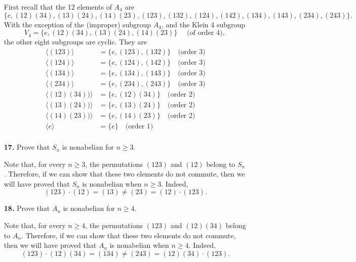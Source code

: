 \documentclass[12pt,reqno]{amsart}
\newcommand{\<}{\ensuremath{\langle}}
\renewcommand{\>}{\ensuremath{\rangle}}
\begin{document}
\begin{enumerate}[{\bf 1.}]
\bigskip

First recall that the 12 elements of $A_4$ are 
\[
\{e,(12)(34), (13)(24), (14)(23), (123), (132), (124), (142), (134),
(143),(234), (243)\}.
\]  
With the exception of the (improper) subgroup $A_4$, and the Klein 4 subgroup
\[
V_4 = \{e, (12)(34), (13)(24), (14)(23)\} \quad \text{ (of order 4), }
\]
 the other eight
subgroups are cyclic.  They are
\begin{align*}
  \<(123)\> &= \{e, (123), (132)\} \quad \text{(order 3)}\\
  \<(124)\> &= \{e, (124), (142)\} \quad \text{(order 3)}\\
  \<(134)\> &= \{e, (134), (143)\} \quad \text{(order 3)}\\
  \<(234)\> &= \{e, (234), (243)\} \quad \text{(order 3)}\\
  \<(12)(34))\> &= \{e, (12)(34)\} \quad \text{(order 2)}\\
  \<(13)(24))\> &= \{e, (13)(24)\} \quad \text{(order 2)}\\
  \<(14)(23))\> &= \{e, (14)(23)\} \quad \text{(order 2)}\\
\<e\> &= \{e\}  \quad \text{(order 1)}\\
\end{align*}

\vskip1cm

\item[{\bf 17.}] 
Prove that $S_n$ is nonabelian for $n \geq 3$.

\bigskip

Note that, for every $n\geq 3$, the permutations $(123)$ and $(12)$ belong to
$S_n$.  Therefore, if we can show that these two elements do not commute, then
we will have proved that $S_n$ is nonabelian when $n\geq 3$. Indeed, 
\[
(123)\cdot (12) = (13) \neq (23) = (12)\cdot(123).
\]

\bigskip
 
\item[{\bf 18.}] 
Prove that $A_n$ is nonabelian for $n \geq 4$.
\bigskip

Note that, for every $n\geq 4$, the permutations $(123)$ and $(12)(34)$ belong to
$A_n$.  Therefore, if we can show that these two elements do not commute, then
we will have proved that $A_n$ is nonabelian when $n\geq 4$. Indeed, 
\[
(123)\cdot (12)(34) = (134) \neq (243) = (12)(34)\cdot(123).
\]
\newpage
 

\end{enumerate}
\end{document}
